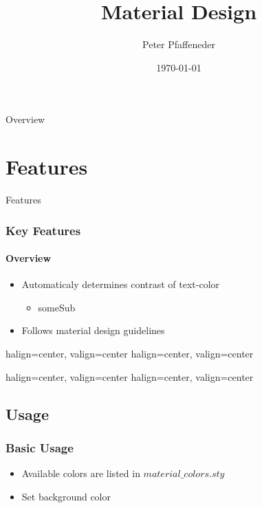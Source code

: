 \documentclass{beamer}
\title{Material Design}
\date{\today}
\author{Peter Pfaffeneder}
\institute[Technische Mathematik]
\begin{document}

\begin{frame}
	\titlepage
\end{frame}

{
	\begin{frame}{Overview}
		\tableofcontents
	\end{frame}
}

\section{Features}
{
	\begin{frame}
		\centering\LARGE{Features}
	\end{frame}
}
\begin{frame}
	\frametitle{Key Features}
	\framesubtitle{Overview}

	\begin{itemize}
		\item Automaticaly determines contrast of text-color
		\begin{itemize}
			\item someSub
		\end{itemize}
		\item Follows material design guidelines
	\end{itemize}
\end{frame}

\begin{frame}
	{halign=center, valign=center}
	{halign=center, valign=center}
\end{frame}

\begin{frame}
	{halign=center, valign=center}
	{halign=center, valign=center}
\end{frame}


\subsection{Usage}
\begin{frame}
	\frametitle{Basic Usage}
	\begin{itemize}
		\item Available colors are listed in $material\_colors.sty$
		\item Set background color
	\end{itemize}
\end{frame}
\end{document}
